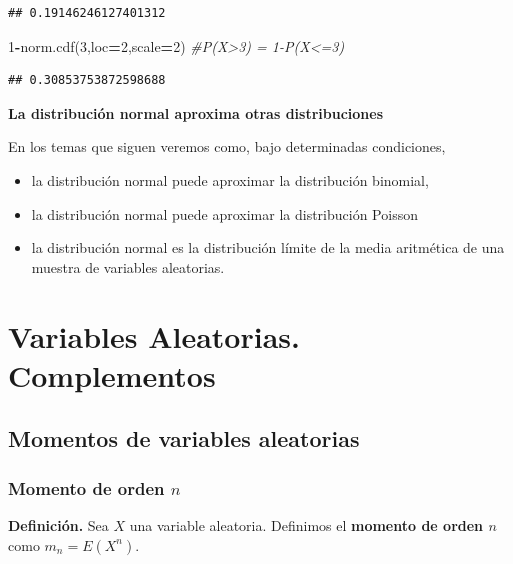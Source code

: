 \documentclass[]{book}
\newenvironment{Shaded}{\begin{snugshade}}{\end{snugshade}}
\newcommand{\CommentTok}[1]{\textcolor[rgb]{0.56,0.35,0.01}{\textit{#1}}}
\newcommand{\DecValTok}[1]{\textcolor[rgb]{0.00,0.00,0.81}{#1}}
\newcommand{\NormalTok}[1]{#1}
\newcommand{\OperatorTok}[1]{\textcolor[rgb]{0.81,0.36,0.00}{\textbf{#1}}}
\providecommand{\tightlist}{%
  \setlength{\itemsep}{0pt}\setlength{\parskip}{0pt}}
\begin{document}
\begin{verbatim}
## 0.19146246127401312
\end{verbatim}

\begin{Shaded}
\begin{Highlighting}[]
\DecValTok{1}\OperatorTok{-}\NormalTok{norm.cdf(}\DecValTok{3}\NormalTok{,loc}\OperatorTok{=}\DecValTok{2}\NormalTok{,scale}\OperatorTok{=}\DecValTok{2}\NormalTok{) }\CommentTok{#P(X>3) = 1-P(X<=3)}
\end{Highlighting}
\end{Shaded}

\begin{verbatim}
## 0.30853753872598688
\end{verbatim}

\textbf{La distribución normal aproxima otras distribuciones}

En los temas que siguen veremos como, bajo determinadas condiciones,

\begin{itemize}
\tightlist
\item
  la distribución normal puede aproximar la distribución binomial,
\item
  la distribución normal puede aproximar la distribución Poisson
\item
  la distribución normal es la distribución límite de la media aritmética de una muestra de variables aleatorias.
\end{itemize}

\hypertarget{variables-aleatorias.-complementos}{%
\chapter{Variables Aleatorias. Complementos}\label{variables-aleatorias.-complementos}}

\hypertarget{momentos-de-variables-aleatorias}{%
\section{Momentos de variables aleatorias}\label{momentos-de-variables-aleatorias}}

\hypertarget{momento-de-orden-n}{%
\subsection{\texorpdfstring{Momento de orden \(n\)}{Momento de orden n}}\label{momento-de-orden-n}}

 \textbf{Definición.}
Sea \(X\) una variable aleatoria. Definimos el \textbf{momento de orden \(n\)} como
\(m_n = E\left(X^n\right)\).
\end{document}
